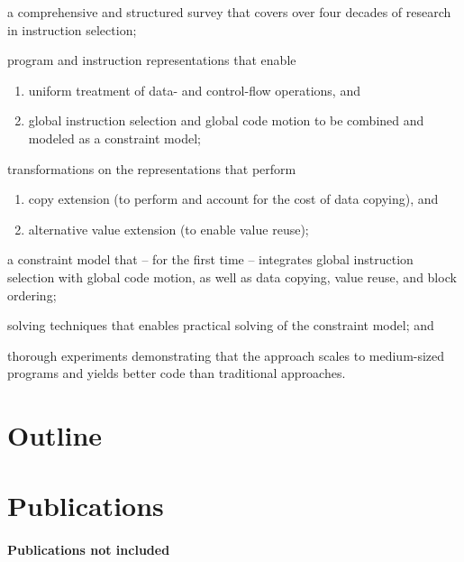 \begin{contributions}
  \item a comprehensive and structured survey that covers over four decades of
    research in instruction selection;
  \item program and instruction representations that enable
    \begin{enumerate}[label=\alph*)]
      \item uniform treatment of data- and control-flow operations, and
      \item global instruction selection and global code motion to be combined
        and modeled as a constraint model;
    \end{enumerate}
  \item transformations on the representations that perform
    \begin{enumerate}[label=\alph*)]
      \item copy extension (to perform and account for the cost of data
        copying), and
      \item alternative value extension (to enable value reuse);
    \end{enumerate}
  \item a constraint model that -- for the first time -- integrates global
    instruction selection with global code motion, as well as data copying,
    value reuse, and block ordering;
  \item solving techniques that enables practical solving of the constraint
    model; and
  \item thorough experiments demonstrating that the approach scales to
    medium-sized programs and yields better code than traditional approaches.
\end{contributions}


\section{Outline}


\section{Publications}


\paragraph{Publications not included}

